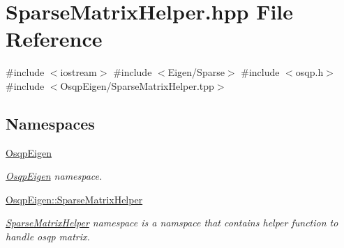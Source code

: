 \section{Sparse\+Matrix\+Helper.\+hpp File Reference}
\label{SparseMatrixHelper_8hpp}
{\ttfamily \#include $<$iostream$>$}\newline
{\ttfamily \#include $<$Eigen/\+Sparse$>$}\newline
{\ttfamily \#include $<$osqp.\+h$>$}\newline
{\ttfamily \#include $<$Osqp\+Eigen/\+Sparse\+Matrix\+Helper.\+tpp$>$}\newline
\subsection*{Namespaces}
\begin{DoxyCompactItemize}
\item 
 \mbox{\hyperlink{namespaceOsqpEigen}{Osqp\+Eigen}}
\begin{DoxyCompactList}\small\item\em \mbox{\hyperlink{namespaceOsqpEigen}{Osqp\+Eigen}} namespace. \end{DoxyCompactList}\item 
 \mbox{\hyperlink{namespaceOsqpEigen_1_1SparseMatrixHelper}{Osqp\+Eigen\+::\+Sparse\+Matrix\+Helper}}
\begin{DoxyCompactList}\small\item\em \mbox{\hyperlink{namespaceOsqpEigen_1_1SparseMatrixHelper}{Sparse\+Matrix\+Helper}} namespace is a namspace that contains helper function to handle osqp matrix. \end{DoxyCompactList}\end{DoxyCompactItemize}
